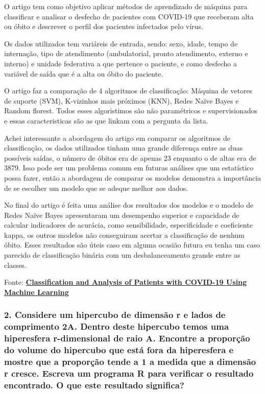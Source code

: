 \documentclass[
]{article}
\begin{document}
O artigo tem como objetivo aplicar métodos de aprendizado de máquina
para classificar e analisar o desfecho de pacientes com COVID-19 que
receberam alta ou óbito e descrever o perfil dos pacientes infectados
pelo vírus.

Os dados utilizados tem variáreis de entrada, sendo: sexo, idade, tempo
de internação, tipo de atendimento (ambulatorial, pronto atendimento,
externo e interno) e unidade federativa a que pertence o paciente, e
como desfecho a variável de saída que é a alta ou óbito do paciente.

O artigo faz a comparação de 4 algoritmos de classificação: Máquina de
vetores de suporte (SVM), K-vizinhos mais próximos (KNN), Redes Naïve
Bayes e Random florest. Todos esses algoristimos são não paramétricos e
supervisionados e essas caracteristicas são as que linkam com a pergunta
da lista.

Achei interessante a abordagem do artigo em comparar os algoritmos de
classificação, os dados utilizados tinham uma grande diferença entre as
duas possíveis saídas, o número de óbitos era de apenas 23 enquanto o de
altas era de 3879. Isso pode ser um problema comum em futuras análises
que um estatístico possa fazer, então a abordagem de comparar os modelos
demonstra a importância de se escolher um modelo que se adeque melhor
aos dados.

No final do artigo é feita uma análise dos resultados dos modelos e o
modelo de Redes Naïve Bayes apresentaram um desempenho superior e
capacidade de calcular indicadores de acurácia, como sensibilidade,
especificidade e coeficiente kappa, os outros modelos não conseguiram
acertar a classificação de nenhum óbito. Esses resultados são úteis caso
em alguma ocasião futura eu tenha um caso parecido de classificação
binária com um desbalanceamento grande entre as classes.

Fonte:
\textbf{\href{https://biometria.ufla.br/index.php/BBJ/article/view/588/362}{Classification
and Analysis of Patients with COVID-19 Using Machine Learning}}

\subsubsection{2. Considere um hipercubo de dimensão r e lados de
comprimento 2A. Dentro deste hipercubo temos uma hiperesfera
r-dimensional de raio A. Encontre a proporção do volume do hipercubo que
está fora da hiperesfera e mostre que a proporção tende a 1 a medida que
a dimensão r cresce. Escreva um programa R para verificar o resultado
encontrado. O que este resultado
significa?}\label{considere-um-hipercubo-de-dimensuxe3o-r-e-lados-de-comprimento-2a.-dentro-deste-hipercubo-temos-uma-hiperesfera-r-dimensional-de-raio-a.-encontre-a-proporuxe7uxe3o-do-volume-do-hipercubo-que-estuxe1-fora-da-hiperesfera-e-mostre-que-a-proporuxe7uxe3o-tende-a-1-a-medida-que-a-dimensuxe3o-r-cresce.-escreva-um-programa-r-para-verificar-o-resultado-encontrado.-o-que-este-resultado-significa}
\end{document}
